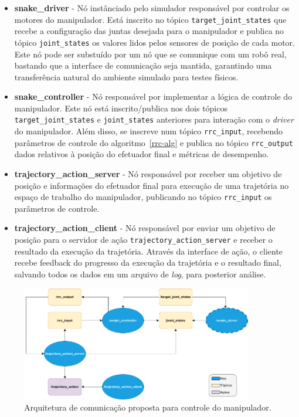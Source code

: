 \begin{itemize}
    \item \textbf{snake\_driver} {-} Nó instânciado pelo simulador responsável por controlar os motores do manipulador.
          Está inscrito no tópico \texttt{target\_joint\_states} que recebe a configuração das juntas desejada para o manipulador
          e publica no tópico \texttt{joint\_states} os valores lidos pelos sensores de posição de cada motor. Este nó pode ser substuído por um nó
          que se comunique com um robô real, bastando que a interface de comunicação seja mantida, garantindo uma transferência natural do ambiente simulado para testes físicos.

    \item \textbf{snake\_controller} {-} Nó responsável por implementar a lógica de controle do manipulador. Este nó está inscrito/publica nos dois tópicos
          \texttt{target\_joint\_states} e \texttt{joint\_states} anteriores para interação com o \emph{driver} do manipulador. Além disso, se inscreve
          num tópico \texttt{rrc\_input}, recebendo parâmetros de controle do algoritmo~\ref{rrc-alg} e publica no tópico \texttt{rrc\_output} dados
          relativos à posição do efetuador final e métricas de desempenho.

    \item \textbf{trajectory\_action\_server} {-} Nó responsável por receber um objetivo de posição e informações do efetuador final para execução de uma trajetória
          no espaço de trabalho do manipulador, publicando no tópico \texttt{rrc\_input} os parâmetros de controle.

    \item \textbf{trajectory\_action\_client} {-} Nó responsável por enviar um objetivo de posição para o servidor de ação \texttt{trajectory\_action\_server} e
          receber o resultado da execução da trajetória. Através da interface de ação, o cliente recebe feedback do progresso da execução da trajetória e o resultado final,
          salvando todos os dados em um arquivo de \emph{log}, para posterior análise.
\end{itemize}

\begin{figure}
    \centering
    \includegraphics[width=0.9\textwidth]{./Images/com-arch.png}
    \caption{Arquitetura de comunicação proposta para controle do manipulador.}\label{fig:coms_arch}
\end{figure}

